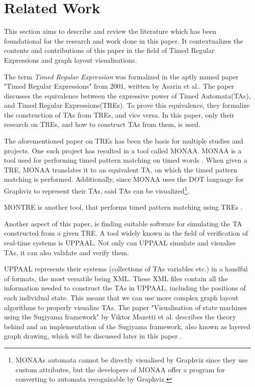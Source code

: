 \section{Related Work}\label{sec:related work}



This section aims to describe and review the literature which has been foundational for the research and work done in this paper. It contextualizes the contents and contributions of this paper in the field of Timed Regular Expressions and graph layout visualisations.

The term \textit{Timed Regular Expression} was formalized in the aptly named paper "Timed Regular Expressions" from 2001, written by Asarin et al.\cite{Eugene2001}. The paper discusses the equivalence between the expressive power of Timed Automata(TAs)\cite{ALUR1994}, and Timed Regular Expressions(TREs). To prove this equivalence, they formalize the construction of TAs from TREs, and vice versa. In this paper, only their research on TREs, and how to construct TAs from them, is used.

The aforementioned paper on TREs has been the basis for multiple studies and projects. One such project has resulted in a tool called MONAA. MONAA is a tool used for performing timed pattern matching on timed words \cite{MONAA2017}\cite{MONAAPAPER2018}. When given a TRE, MONAA translates it to an equivalent TA, on which the timed pattern matching is performed. Additionally, since MONAA uses the DOT language for Graphviz \cite{Graphviz} to represent their TAs, said TAs can be visualized\footnote{MONAAs automata cannot be directly visualised by Graphviz since they use custom attributes, but the developers of MONAA offer a program for converting to automata recognizable by Graphviz\cite{MONAA2017}.}.

MONTRE is another tool, that performs timed pattern matching using TREs \cite{MONTRE2016}.

Another aspect of this paper, is finding suitable software for simulating the TA constructed from a given TRE. A tool widely known in the field of verification of real-time systems is UPPAAL. Not only can UPPAAL simulate and visualise TAs, it can also validate and verify them\cite{UPPAAL}.

UPPAAL represents their systems (collections of TAs variables etc.) in a handful of formats, the most versatile being XML\cite{UPPAAL}. These XML files contain all the information needed to construct the TAs in UPPAAL, including the positions of each individual state. This means that we can use more complex graph layout algorithms to properly visualize TAs. The paper "Visualisation of state machines using the Sugiyama framework" by Viktor Mazetti et al. describes the theory behind and an implementation of the Sugiyama framework, also known as layered graph drawing, which will be discussed later in this paper \cite{Mazetti2012}.